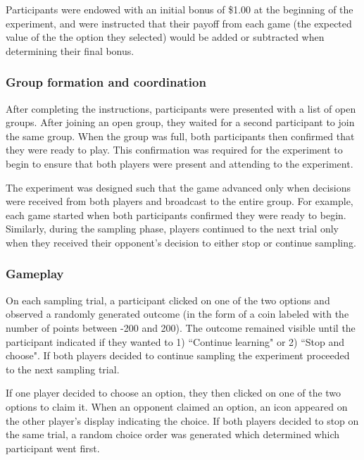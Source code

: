 \documentclass[11pt,jou]{apa6}
\begin{document}
Participants were endowed with an initial bonus of \$1.00 at the beginning of the experiment, and were instructed that their payoff from each game (the expected value of the the option they selected) would be added or subtracted when determining their final bonus.

\subsubsection{Group formation and coordination}

After completing the instructions, participants were presented with a list of open groups.
After joining an open group, they waited for a second participant to join the same group. 
When the group was full, both participants then confirmed that they were ready to play.
This confirmation was required for the experiment to begin to ensure that both players were present and attending to the experiment.

The experiment was designed such that the game advanced only when decisions were received from both players and broadcast to the entire group. 
For example, each game started when both participants confirmed they were ready to begin.
Similarly, during the sampling phase, players continued to the next trial only when they received their opponent's decision to either stop or continue sampling.

\subsubsection{Gameplay}

On each sampling trial, a participant clicked on one of the two options and observed a randomly generated outcome (in the form of a coin labeled with the number of points between -200 and 200). 
The outcome remained visible until the participant indicated if they wanted to 1) ``Continue learning" or 2) ``Stop and choose". 
If both players decided to continue sampling the experiment proceeded to the next sampling trial.

If one player decided to choose an option, they then clicked on one of the two options to claim it. 
When an opponent claimed an option, an icon appeared on the other player's display indicating the choice. 
If both players decided to stop on the same trial, a random choice order was generated which determined which participant went first.
\end{document}
